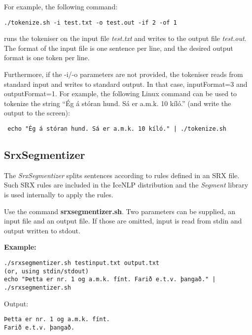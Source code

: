 \documentclass[11pt]{article}
\begin{document}
For example, the following command:
\begin{verbatim}
./tokenize.sh -i test.txt -o test.out -if 2 -of 1
\end{verbatim}
runs the tokeniser on the input file \emph{test.txt} and writes to the output file \emph{test.out}.
The format of the input file is one sentence per line, and the desired output format is one token per line.

Furthermore, if the -i/-o parameters are not provided, the tokeniser reads from standard input and writes to standard output. In that case, inputFormat=3 and outputFormat=1. For example, the following Linux command can be used to tokenize the string ``Ég á stóran hund. Sá er a.m.k. 10 kíló.'' (and write the output to the screen): 
\begin{verbatim}
 echo "Ég á stóran hund. Sá er a.m.k. 10 kíló." | ./tokenize.sh
\end{verbatim}

\subsection{SrxSegmentizer}
The \textit{SrxSegmentizer} splits sentences according to rules defined in an SRX file. Such SRX
rules are included in the IceNLP distribution and the \textit{Segment} library is used internally
to apply the rules.

Use the command \textbf{srxsegmentizer.sh}. Two parameters can be supplied, an input file
and an output file. If those are omitted, input is read from stdin and output written to
stdout.

\textbf{Example:}

\begin{verbatim}
./srxsegmentizer.sh testinput.txt output.txt 
(or, using stdin/stdout)
echo "Þetta er nr. 1 og a.m.k. fínt. Farið e.t.v. þangað." | ./srxsegmentizer.sh
\end{verbatim}

Output:
\begin{verbatim}
Þetta er nr. 1 og a.m.k. fínt. 
Farið e.t.v. þangað. 
\end{verbatim}
\end{document}
